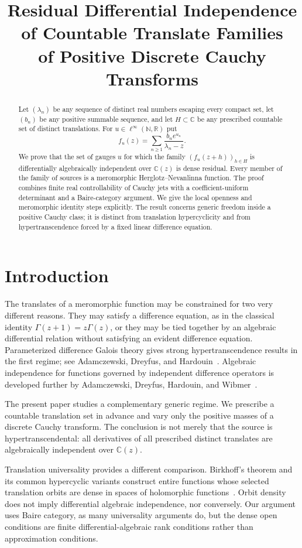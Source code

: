 \documentclass[11pt]{article}
\title{Residual Differential Independence of Countable Translate Families\\
of Positive Discrete Cauchy Transforms}
\author{}
\date{}
\newcommand{\C}{\mathbb C}
\newcommand{\R}{\mathbb R}
\newcommand{\N}{\mathbb N}
\begin{document}
\maketitle

\begin{abstract}
Let $(\lambda_n)$ be any sequence of distinct real numbers escaping every compact set, let
$(b_n)$ be any positive summable sequence, and let $H\subset\C$ be any prescribed countable set
of distinct translations.  For $u\in\ell^\infty(\N,\R)$ put
\[
  f_u(z)=\sum_{n\geq1}\frac{b_ne^{u_n}}{\lambda_n-z}.
\]
We prove that the set of gauges $u$ for which the family
$(f_u(z+h))_{h\in H}$ is differentially algebraically independent over $\C(z)$ is dense
residual.  Every member of the family of sources is a meromorphic Herglotz--Nevanlinna function.
The proof combines finite real controllability of Cauchy jets with a coefficient-uniform
determinant and a Baire-category argument.  We give the local openness and meromorphic
identity steps explicitly.  The result concerns generic freedom inside a positive Cauchy class;
it is distinct from translation hypercyclicity and from hypertranscendence forced by a fixed
linear difference equation.
\end{abstract}

\section{Introduction}

The translates of a meromorphic function may be constrained for two very different reasons.
They may satisfy a difference equation, as in the classical identity
$\Gamma(z+1)=z\Gamma(z)$, or they may be tied together by an algebraic differential relation
without satisfying an evident difference equation.  Parameterized difference Galois theory gives
strong hypertranscendence results in the first regime; see
Adamczewski, Dreyfus, and Hardouin~\cite{ADH2021}.  Algebraic independence for functions governed
by independent difference operators is developed further by Adamczewski, Dreyfus, Hardouin, and
Wibmer~\cite{ADHW2024}.

The present paper studies a complementary generic regime.  We prescribe a countable translation
set in advance and vary only the positive masses of a discrete Cauchy transform.  The conclusion
is not merely that the source is hypertranscendental: all derivatives of all prescribed distinct
translates are algebraically independent over $\C(z)$.

Translation universality provides a different comparison.  Birkhoff's theorem and its common
hypercyclic variants construct entire functions whose selected translation orbits are dense in
spaces of holomorphic functions~\cite{Birkhoff1929,Tsirivas2014}.  Orbit density does not imply
differential algebraic independence, nor conversely.  Our argument uses Baire category, as many
universality arguments do, but the dense open conditions are finite differential-algebraic rank
conditions rather than approximation conditions.
\end{document}
